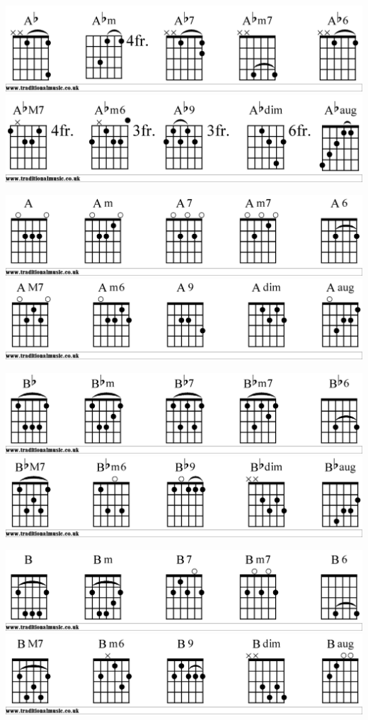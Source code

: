 

\includegraphics[scale=.15]{chords/Abgtr1}
\includegraphics[scale=.15]{chords/Abgtr2}

\includegraphics[scale=.15]{chords/Agtr1}
\includegraphics[scale=.15]{chords/Agtr2}

\includegraphics[scale=.15]{chords/Bbgtr1}
\includegraphics[scale=.15]{chords/Bbgtr2}

\includegraphics[scale=.15]{chords/Bgtr1}
\includegraphics[scale=.15]{chords/Bgtr2}

